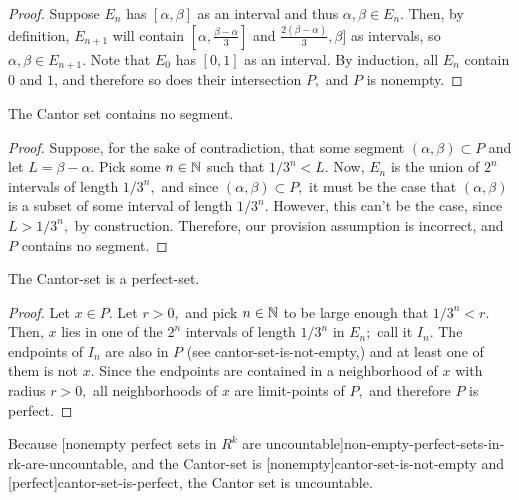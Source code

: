 \documentclass{article}
\begin{document}
\begin{proof}
Suppose $E_n$ has $[\alpha, \beta]$ as an \@{interval} and thus $\alpha, \beta \in E_n.$ Then, by definition, $E_{n+1}$ will contain $[\alpha, \frac{\beta - \alpha}{3}]$ and $\frac{2(\beta - \alpha)}{3}, \beta]$ as intervals, so $\alpha, \beta \in E_{n+1}.$ Note that $E_0$ has $[0, 1]$ as an interval. By induction, all $E_n$ contain $0$ and $1$, and therefore so does their intersection $P,$ and $P$ is nonempty.
\end{proof}

\begin{theorem}\label{cantor-set-contains-no-segment}
The Cantor set contains no \@{segment}.
\end{theorem}

\begin{proof}
Suppose, for the sake of contradiction, that some \@{segment} $(\alpha, \beta) \subset P$ and let $L = \beta - \alpha.$ Pick some $n \in \mathbb{N}$ such that $1/3^n < L.$ Now, $E_n$ is the union of $2^n$ \@{intervals} of length $1/3^n,$ and since $(\alpha, \beta) \subset P,$ it must be the case that $(\alpha, \beta)$ is a \@{subset} of some interval of length $1/3^n.$ However, this can't be the case, since $L > 1/3^n,$ by construction. Therefore, our provision assumption is incorrect, and $P$ contains no segment.
\end{proof}

\begin{theorem}\label{cantor-set-is-perfect}
The \@{Cantor-set} is a \@{perfect-set}.
\end{theorem}

\begin{proof}
Let $x \in P.$ Let $r > 0,$ and pick $n \in \mathbb{N}$ to be large enough that $1/3^n < r.$ Then, $x$ lies in one of the $2^n$ \@{intervals} of length $1/3^n$ in $E_n;$ call it $I_n.$ The endpoints of $I_n$ are also in $P$ (see \@{cantor-set-is-not-empty},) and at least one of them is not $x.$ Since the endpoints are contained in a \@{neighborhood} of $x$ with radius $r > 0,$ all neighborhoods of $x$ are \@{limit-points} of $P,$ and therefore $P$ is \@{perfect}.
\end{proof}

\begin{corollary}\label{cantor-set-is-uncountable}
Because \@[nonempty perfect sets in $R^k$ are uncountable]{non-empty-perfect-sets-in-rk-are-uncountable}, and the \@{Cantor-set} is \@[nonempty]{cantor-set-is-not-empty} and \@[perfect]{cantor-set-is-perfect}, the Cantor set is uncountable.
\end{corollary}
\end{document}
